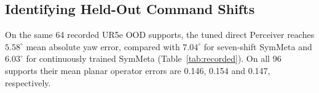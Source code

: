 \documentclass{article}
\theoremstyle{plain}
\theoremstyle{remark}
\begin{document}
\begin{table}[t]
  \centering
  \caption{UR5e ($\pi_{0.5}$) on four OOD shifts. Adapter and seed-41 rows share the 32 query resets. Policy noise differs across runs. $^\dagger$The adapter evaluator's own nominal control covers eight tasks.}
  \label{tab:fewshot}
  \scriptsize
  \setlength{\tabcolsep}{3pt}
\end{table}

\subsection{Identifying Held-Out Command Shifts}
\label{sec:scaling}

On the same 64 recorded UR5e OOD supports, the tuned direct Perceiver reaches $5.58^\circ$ mean absolute yaw error, compared with $7.04^\circ$ for seven-shift SymMeta and $6.03^\circ$ for continuously trained SymMeta (Table~\ref{tab:recorded}). On all 96 supports their mean planar operator errors are 0.146, 0.154 and 0.147, respectively.
\end{document}
